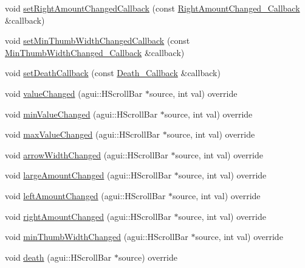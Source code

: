 \begin{DoxyCompactItemize}
\item 
void \mbox{\hyperlink{classec_1_1_generic_h_scroll_bar_listener_a483130cae3ea6a8b20c3b83ff0a6e996}{set\+Right\+Amount\+Changed\+Callback}} (const \mbox{\hyperlink{classec_1_1_generic_h_scroll_bar_listener_a8fa94a611c4160acb1c5bc062046fc8a}{Right\+Amount\+Changed\+\_\+\+Callback}} \&callback)
\item 
void \mbox{\hyperlink{classec_1_1_generic_h_scroll_bar_listener_a3861dfbf1438257ac974b128528e5bd5}{set\+Min\+Thumb\+Width\+Changed\+Callback}} (const \mbox{\hyperlink{classec_1_1_generic_h_scroll_bar_listener_a3bfa95b52b5ce492d638cef95b830227}{Min\+Thumb\+Width\+Changed\+\_\+\+Callback}} \&callback)
\item 
void \mbox{\hyperlink{classec_1_1_generic_h_scroll_bar_listener_a561a6e1f4c7ddb99eb87d7ec692f933d}{set\+Death\+Callback}} (const \mbox{\hyperlink{classec_1_1_generic_h_scroll_bar_listener_a20ad93a508cb41b9bd1f2de9f470d617}{Death\+\_\+\+Callback}} \&callback)
\item 
void \mbox{\hyperlink{classec_1_1_generic_h_scroll_bar_listener_a7c55d42a9623801361988a153d5d2d6d}{value\+Changed}} (agui\+::\+H\+Scroll\+Bar $\ast$source, int val) override
\item 
void \mbox{\hyperlink{classec_1_1_generic_h_scroll_bar_listener_acd923e5019bdb894f237c896908ece95}{min\+Value\+Changed}} (agui\+::\+H\+Scroll\+Bar $\ast$source, int val) override
\item 
void \mbox{\hyperlink{classec_1_1_generic_h_scroll_bar_listener_a9d2e31617fd515c9b494e77d10b31031}{max\+Value\+Changed}} (agui\+::\+H\+Scroll\+Bar $\ast$source, int val) override
\item 
void \mbox{\hyperlink{classec_1_1_generic_h_scroll_bar_listener_a2f7ccb2b087483898e92d47516af5d1c}{arrow\+Width\+Changed}} (agui\+::\+H\+Scroll\+Bar $\ast$source, int val) override
\item 
void \mbox{\hyperlink{classec_1_1_generic_h_scroll_bar_listener_a8d92e3a45f56fb3f647d1e9a8a481515}{large\+Amount\+Changed}} (agui\+::\+H\+Scroll\+Bar $\ast$source, int val) override
\item 
void \mbox{\hyperlink{classec_1_1_generic_h_scroll_bar_listener_a3e7948fc3dad289575065f426795057b}{left\+Amount\+Changed}} (agui\+::\+H\+Scroll\+Bar $\ast$source, int val) override
\item 
void \mbox{\hyperlink{classec_1_1_generic_h_scroll_bar_listener_a770fbca4c0ce3c02dec9045e44043737}{right\+Amount\+Changed}} (agui\+::\+H\+Scroll\+Bar $\ast$source, int val) override
\item 
void \mbox{\hyperlink{classec_1_1_generic_h_scroll_bar_listener_aa760833fa9a03233436ba06c80d49b3a}{min\+Thumb\+Width\+Changed}} (agui\+::\+H\+Scroll\+Bar $\ast$source, int val) override
\item 
void \mbox{\hyperlink{classec_1_1_generic_h_scroll_bar_listener_aeb2f75a18fee2e66026f9e61fd5e31f7}{death}} (agui\+::\+H\+Scroll\+Bar $\ast$source) override
\end{DoxyCompactItemize}


